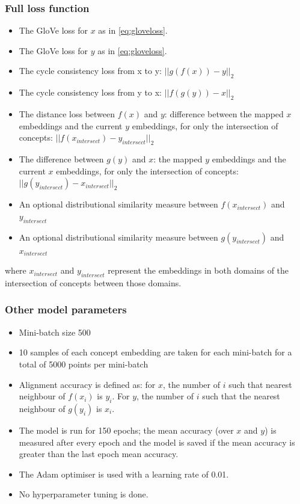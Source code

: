 
\subsubsection{Full loss function}
\begin{itemize}
    \item The GloVe loss for $x$ as in \ref{eq:gloveloss}. 
    \item The GloVe loss for $y$ as in \ref{eq:gloveloss}. 
    \item The cycle consistency loss from x to y: $||g(f(x)) - y||_2$
    \item The cycle consistency loss from y to x: $||f(g(y)) - x||_2$
    \item The distance loss between $f(x)$ and $y$: difference between the mapped $x$ embeddings and the current $y$ embeddings, for only the intersection of concepts: $||f(x_{intersect}) - y_{intersect}||_2$
    \item The difference between $g(y)$ and $x$: the mapped $y$ embeddings and the current $x$ embeddings, for only the intersection of concepts: $||g(y_{intersect}) - x_{intersect}||_2$
    \item An optional distributional similarity measure between $f(x_{intersect})$ and $y_{intersect}$
    \item An optional distributional similarity measure between $g(y_{intersect})$ and $x_{intersect}$
\end{itemize}

where $x_{intersect}$ and $y_{intersect}$ represent the embeddings in both domains of the intersection of concepts between those domains. 

\subsubsection{Other model parameters}

\begin{itemize}
    \item Mini-batch size 500
    \item 10 samples of each concept embedding are taken for each mini-batch for a total of 5000 points per mini-batch
    \item Alignment accuracy is defined as: for $x$, the number of $i$ such that nearest neighbour of $f(x_i)$ is  $y_i$. For $y$, the number of $i$ such that the nearest neighbour of $g(y_i)$ is $x_i$. 
    \item The model is run for 150 epochs; the mean accuracy (over $x$ and $y$) is measured after every epoch and the model is saved if the mean accuracy is greater than the last epoch mean accuracy.
    \item The Adam optimiser is used with a learning rate of 0.01.
    \item No hyperparameter tuning is done. 
\end{itemize}

